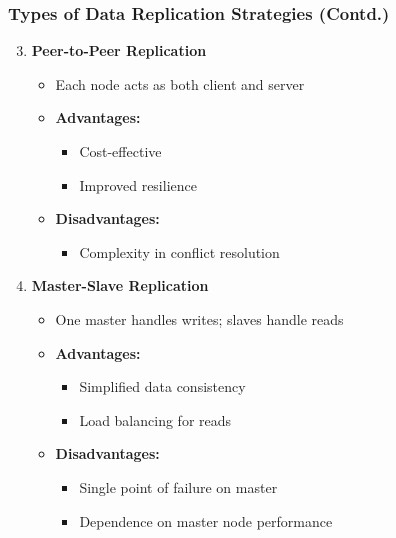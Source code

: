 \documentclass[aspectratio=169]{beamer}
\begin{document}
\begin{frame}[fragile]
    \frametitle{Types of Data Replication Strategies (Contd.)}
    \begin{enumerate}
        \setcounter{enumi}{2}
        \item \textbf{Peer-to-Peer Replication}
            \begin{itemize}
                \item Each node acts as both client and server
                \item \textbf{Advantages:}
                    \begin{itemize}
                        \item Cost-effective
                        \item Improved resilience
                    \end{itemize}
                \item \textbf{Disadvantages:}
                    \begin{itemize}
                        \item Complexity in conflict resolution
                    \end{itemize}
            \end{itemize}
        
        \item \textbf{Master-Slave Replication}
            \begin{itemize}
                \item One master handles writes; slaves handle reads
                \item \textbf{Advantages:}
                    \begin{itemize}
                        \item Simplified data consistency
                        \item Load balancing for reads
                    \end{itemize}
                \item \textbf{Disadvantages:}
                    \begin{itemize}
                        \item Single point of failure on master
                        \item Dependence on master node performance
                    \end{itemize}
            \end{itemize}
    \end{enumerate}
\end{frame}
\end{document}
